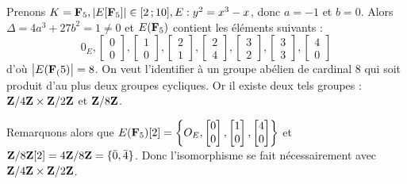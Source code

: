	\begin{ex}
		Prenons $K = \mathbf{F}_5, \left\lvert E[\mathbf{F}_5]\right\rvert \in \mathopen{}\mathclose{\left[2\mathclose{}\mathpunct{};10\right]}, E : y^2 = x^3 - x$, donc $a = -1$ et $b = 0$.
		Alors $\Delta = 4a^3 + 27 b^2 = 1 \neq 0$ et $E(\mathbf{F}_5)$ contient les éléments suivants :
		$$0_E,
		\begin{bmatrix} 0 \\ 0 \end{bmatrix},
		\begin{bmatrix} 1 \\ 0 \end{bmatrix},
		\begin{bmatrix} 2 \\ 1 \end{bmatrix},
		\begin{bmatrix} 2 \\ 4 \end{bmatrix},
		\begin{bmatrix} 3 \\ 2 \end{bmatrix},
		\begin{bmatrix} 3 \\ 3 \end{bmatrix},
		\begin{bmatrix} 4 \\ 0 \end{bmatrix}$$
		d'où $\left\lvert E(\mathbf{F}_(5)\right\rvert = 8$.
		On veut l'identifier à un groupe abélien de cardinal 8 qui soit produit d'au plus deux groupes cycliques.
		Or il existe deux tels groupes : $\mathbf{Z} / 4\mathbf{Z} \times \mathbf{Z} / 2\mathbf{Z}$ et $\mathbf{Z} / 8\mathbf{Z}$.
		
		Remarquons alors que $E(\mathbf{F}_5)[2] = \left\{ O_E, \begin{bmatrix} 0 \\ 0 \end{bmatrix}, \begin{bmatrix} 1 \\ 0 \end{bmatrix}, \begin{bmatrix} 4 \\ 0 \end{bmatrix} \right\}$ et $\mathbf{Z} / 8\mathbf{Z}[2] = 4\mathbf{Z} / 8\mathbf{Z} = \{ \bar 0, \bar 4 \}$.
		Donc l'isomorphisme se fait nécessairement avec $\mathbf{Z} / 4\mathbf{Z} \times \mathbf{Z} / 2\mathbf{Z}$.\\
	\end{ex}
	
